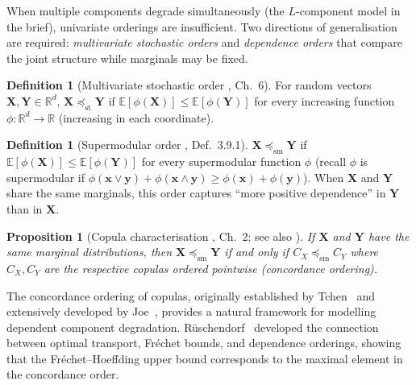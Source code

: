 \documentclass[11pt,a4paper]{article}
\theoremstyle{plain}
\newtheorem{proposition}[theorem]{Proposition}
\theoremstyle{definition}
\newtheorem{definition}[theorem]{Definition}
\theoremstyle{remark}
\begin{document}
When multiple components degrade simultaneously (the $L$-component model in the brief),
univariate orderings are insufficient.  Two directions of generalisation are required:
\emph{multivariate stochastic orders} and \emph{dependence orders} that compare the
joint structure while marginals may be fixed.

\begin{definition}[Multivariate stochastic order {\cite{shaked2007}, Ch.~6}]
\label{def:multivariate_st}
For random vectors $\mathbf{X}, \mathbf{Y} \in \mathbb{R}^d$,
$\mathbf{X} \preceq_{\mathrm{st}} \mathbf{Y}$ if
$\mathbb{E}[\phi(\mathbf{X})] \leq \mathbb{E}[\phi(\mathbf{Y})]$
for every increasing function $\phi \colon \mathbb{R}^d \to \mathbb{R}$
(increasing in each coordinate).
\end{definition}

\begin{definition}[Supermodular order {\cite{muller2002}, Def.~3.9.1}]
\label{def:supermod}
$\mathbf{X} \preceq_{\mathrm{sm}} \mathbf{Y}$ if
$\mathbb{E}[\phi(\mathbf{X})] \leq \mathbb{E}[\phi(\mathbf{Y})]$
for every supermodular function $\phi$ (recall $\phi$ is supermodular if
$\phi(\mathbf{x} \vee \mathbf{y}) + \phi(\mathbf{x} \wedge \mathbf{y})
\geq \phi(\mathbf{x}) + \phi(\mathbf{y})$).
When $\mathbf{X}$ and $\mathbf{Y}$ share the same marginals, this order captures
``more positive dependence'' in $\mathbf{Y}$ than in $\mathbf{X}$.
\end{definition}


\begin{proposition}[Copula characterisation {\cite{joe2015}, Ch.~2; see also \cite{tchen1980}}]
\label{prop:copula}
If $\mathbf{X}$ and $\mathbf{Y}$ have the same marginal distributions, then
$\mathbf{X} \preceq_{\mathrm{sm}} \mathbf{Y}$ if and only if
$C_X \preceq_{\mathrm{sm}} C_Y$ where $C_X, C_Y$ are the respective copulas
ordered pointwise (concordance ordering).
\end{proposition}

The concordance ordering of copulas, originally established by
Tchen~\cite{tchen1980} and extensively developed by
Joe~\cite{joe2015}, provides a natural framework for modelling
dependent component degradation.  R\"uschendorf~\cite{ruschendorf2013} developed
the connection between optimal transport, Fr\'echet bounds, and dependence orderings,
showing that the Fr\'echet--Hoeffding upper bound corresponds to the maximal element in
the concordance order.
\end{document}
